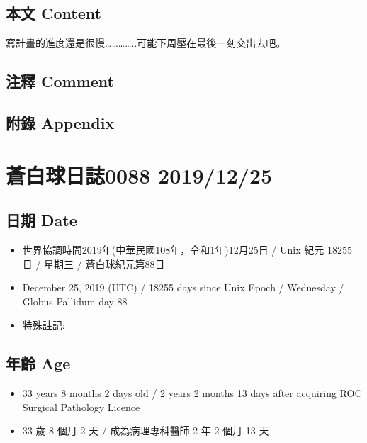 \documentclass[a5paper, 12pt
]{book}
\providecommand{\tightlist}{%
  \setlength{\itemsep}{0pt}\setlength{\parskip}{0pt}}
\begin{document}
\hypertarget{ux672cux6587-content-23}{%
\subsection{本文 Content}\label{ux672cux6587-content-23}}

寫計畫的進度還是很慢\ldots\ldots\ldots\ldots..可能下周壓在最後一刻交出去吧。

\hypertarget{ux6ce8ux91cb-comment-22}{%
\subsection{注釋 Comment}\label{ux6ce8ux91cb-comment-22}}

\hypertarget{ux9644ux9304-appendix-23}{%
\subsection{附錄 Appendix}\label{ux9644ux9304-appendix-23}}

\hypertarget{ux84bcux767dux7403ux65e5ux8a8c0088-20191225}{%
\section{蒼白球日誌0088
2019/12/25}\label{ux84bcux767dux7403ux65e5ux8a8c0088-20191225}}

\hypertarget{ux65e5ux671f-date-24}{%
\subsection{日期 Date}\label{ux65e5ux671f-date-24}}

\begin{itemize}
\tightlist
\item
  世界協調時間2019年(中華民國108年，令和1年)12月25日 / Unix 紀元 18255
  日 / 星期三 / 蒼白球紀元第88日
\item
  December 25, 2019 (UTC) / 18255 days since Unix Epoch / Wednesday /
  Globus Pallidum day 88
\item
  特殊註記:
\end{itemize}

\hypertarget{ux5e74ux9f61-age-24}{%
\subsection{年齡 Age}\label{ux5e74ux9f61-age-24}}

\begin{itemize}
\tightlist
\item
  33 years 8 months 2 days old / 2 years 2 months 13 days after
  acquiring ROC Surgical Pathology Licence
\item
  33 歲 8 個月 2 天 / 成為病理專科醫師 2 年 2 個月 13 天
\end{itemize}
\end{document}
